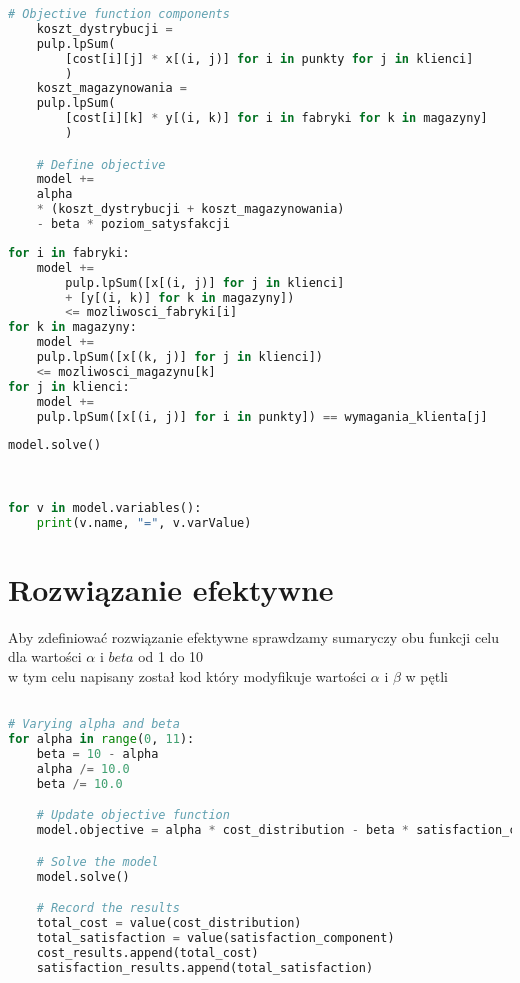 \documentclass[12pt]{article}
\begin{document}
\begin{lstlisting}[language=Python, caption={Funkcje celu}]
    # Objective function components
    koszt_dystrybucji =
    pulp.lpSum(
        [cost[i][j] * x[(i, j)] for i in punkty for j in klienci]
        )
    koszt_magazynowania =
    pulp.lpSum(
        [cost[i][k] * y[(i, k)] for i in fabryki for k in magazyny]
        )

    # Define objective
    model += 
    alpha
    * (koszt_dystrybucji + koszt_magazynowania)
    - beta * poziom_satysfakcji    
\end{lstlisting}

\begin{lstlisting}[language=Python, caption={Ograniczenia}]
for i in fabryki:
    model +=
        pulp.lpSum([x[(i, j)] for j in klienci]
        + [y[(i, k)] for k in magazyny])
        <= mozliwosci_fabryki[i]
for k in magazyny:
    model +=
    pulp.lpSum([x[(k, j)] for j in klienci])
    <= mozliwosci_magazynu[k]
for j in klienci:
    model +=
    pulp.lpSum([x[(i, j)] for i in punkty]) == wymagania_klienta[j]
\end{lstlisting}

\begin{lstlisting}[language=Python, caption={Rozwiązanie problemu}]
    model.solve()
\end{lstlisting}
\

\begin{lstlisting}[language=Python, caption={Przedstawienie wyników}]
for v in model.variables():
    print(v.name, "=", v.varValue)
\end{lstlisting}

\section{Rozwiązanie efektywne}
Aby zdefiniować rozwiązanie efektywne sprawdzamy sumaryczy obu funkcji celu dla wartości $\alpha$ i $beta$ od 1 do 10 \\ 
w tym celu napisany został kod który modyfikuje wartości $\alpha$ i $\beta$ w pętli 

\begin{lstlisting}[language=Python, caption={Wyznaczanie alpha i beta}]

# Varying alpha and beta
for alpha in range(0, 11):
    beta = 10 - alpha
    alpha /= 10.0
    beta /= 10.0

    # Update objective function
    model.objective = alpha * cost_distribution - beta * satisfaction_component

    # Solve the model
    model.solve()

    # Record the results
    total_cost = value(cost_distribution)
    total_satisfaction = value(satisfaction_component)
    cost_results.append(total_cost)
    satisfaction_results.append(total_satisfaction)
\end{lstlisting}

    
\end{document}

